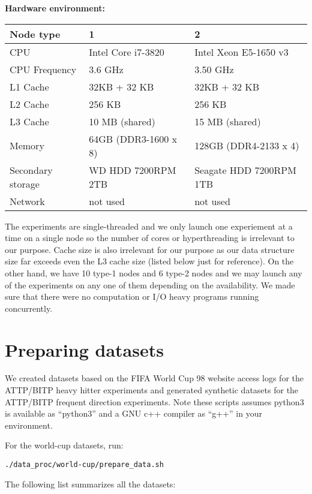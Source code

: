 \documentclass[11pt]{article}
\begin{document}
\newpage
{\bf Hardware environment:}

\vspace{1mm}
\begin{tabular}{|l|l|l|}
	\hline
	Node type &  1 & 2 \\\hline
	CPU & Intel Core i7-3820 & Intel Xeon E5-1650 v3 \\\hline
	CPU Frequency & 3.6 GHz & 3.50 GHz \\\hline
	L1 Cache & 32KB + 32 KB & 32KB + 32 KB\\\hline
	L2 Cache & 256 KB & 256 KB\\\hline
	L3 Cache & 10 MB (shared) & 15 MB (shared) \\\hline
	Memory & 64GB (DDR3-1600 x 8) & 128GB (DDR4-2133 x 4) \\\hline
	Secondary storage & WD HDD 7200RPM 2TB & Seagate HDD 7200RPM 1TB
	\\\hline
	Network & not used & not used \\\hline
\end{tabular}
\vspace{1mm}

The experiments are single-threaded and we only
launch one experiement at a time on a single node so the number of
cores or hyperthreading is irrelevant to our purpose. Cache size is
also irrelevant for our purpose as our data structure size far exceeds
even the L3 cache size (listed below just for reference). On the other
hand, we have 10 type-1 nodes and 6 type-2 nodes and we may launch any
of the experiments on any one of them depending on the availability.
We made sure that there were no computation or I/O heavy programs
running concurrently.

\section{Preparing datasets}

We created datasets based on the FIFA World Cup 98 website access logs
for the ATTP/BITP heavy hitter experiments and generated synthetic
datasets for the ATTP/BITP frequent direction experiments. Note these
scripts assumes python3 is available as ``python3'' and a GNU c++
compiler as ``g++'' in your environment.

For the world-cup datasets, run:
\begin{verbatim}
./data_proc/world-cup/prepare_data.sh
\end{verbatim}



The
following list summarizes all the datasets:

\begin{tabular}{}
\end{tabular}
\end{document}
